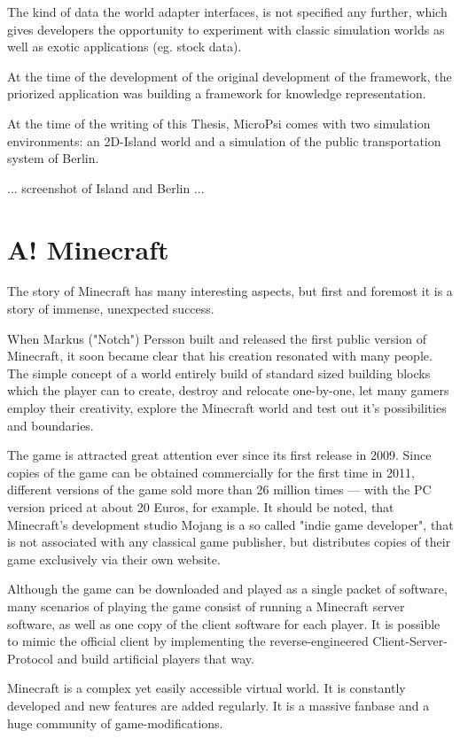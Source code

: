 The kind of data the world adapter interfaces, is not specified any further, which gives developers the opportunity to experiment with classic simulation worlds as well as exotic applications (eg. stock data).~\cite{conf/agi/Bach12}

At the time of the development of the original development of the framework, the priorized application was building a framework for knowledge representation.~\cite{conf/agi/Bach12}

At the time of the writing of this Thesis, MicroPsi comes with two simulation environments: an 2D-Island world and a simulation of the public transportation system of Berlin.

... screenshot of Island and Berlin ... %

    \section{A! Minecraft}
The story of Minecraft has many interesting aspects, but first and foremost it is a story of immense, unexpected success.

When Markus ("Notch") Persson built and released the first public version of Minecraft, it soon became clear that his creation resonated with many people. The simple concept of a world entirely build of standard sized building blocks which the player can to create, destroy and relocate one-by-one, let many gamers employ their creativity, explore the Minecraft world and test out it's possibilities and boundaries.

The game is attracted great attention ever since its first release in 2009. Since copies of the game can be obtained commercially for the first time in 2011, different versions of the game sold more than 26 million times --- with the PC version priced at about 20 Euros, for example. It should be noted, that Minecraft's development studio Mojang is a so called "indie game developer", that is not associated with any classical game publisher, but distributes copies of their game exclusively via their own website.

Although the game can be downloaded and played as a single packet of software, many scenarios of playing the game consist of running a Minecraft server software, as well as one copy of the client software for each player. It is possible to mimic the official client by implementing the reverse-engineered Client-Server-Protocol and build artificial players that way.

Minecraft is a complex yet easily accessible virtual world. It is constantly developed and new features are added regularly. It is a massive fanbase and a huge community of game-modifications.


